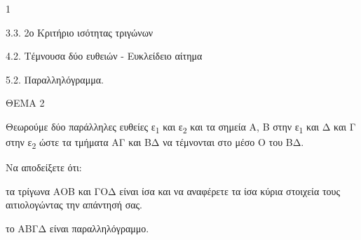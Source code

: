 \begin{ylh}{1}
    \item 3.3. 2ο Κριτήριο ισότητας τριγώνων
    \item 4.2. Τέμνουσα δύο ευθειών - Ευκλείδειο αίτημα
    \item 5.2. Παραλληλόγραμμα.
\end{ylh}

ΘΕΜΑ 2

Θεωρούμε δύο παράλληλες ευθείες ε\textsubscript{1} και ε\textsubscript{2} και τα σημεία Α, Β στην ε\textsubscript{1} και Δ και Γ στην ε\textsubscript{2} ώστε τα τμήματα ΑΓ και ΒΔ να τέμνονται στο μέσο Ο του ΒΔ.

Να αποδείξετε ότι:

\begin{alist}
\item τα τρίγωνα ΑΟΒ και ΓΟΔ είναι ίσα και να αναφέρετε τα ίσα κύρια στοιχεία τους αιτιολογώντας την απάντησή σας. 

\item το ΑΒΓΔ είναι παραλληλόγραμμο. 


\begin{center}
\end{center}
\end{alist}
